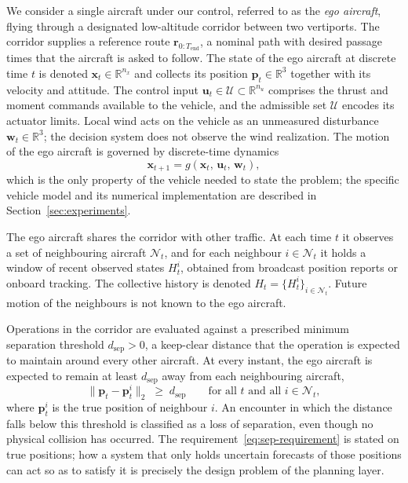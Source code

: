 \documentclass[11pt]{article}
\theoremstyle{plain}
\theoremstyle{definition}
\newcommand{\R}{\mathbb{R}}
\newcommand{\bx}{\bm{x}}
\newcommand{\bu}{\bm{u}}
\newcommand{\bw}{\bm{w}}
\begin{document}
We consider a single aircraft under our control, referred to as the
\emph{ego aircraft}, flying through a designated low-altitude corridor
between two vertiports. The corridor supplies a reference route
$\bm{r}_{0:T_{\mathrm{end}}}$, a nominal path with desired passage times
that the aircraft is asked to follow. The state of the ego aircraft at
discrete time $t$ is denoted $\bx_t \in \R^{n_x}$ and collects its
position $\bm{p}_t \in \R^3$ together with its velocity and attitude. The
control input $\bu_t \in \mathcal{U} \subset \R^{n_u}$ comprises the
thrust and moment commands available to the vehicle, and the admissible
set $\mathcal{U}$ encodes its actuator limits. Local wind acts on the
vehicle as an unmeasured disturbance $\bw_t \in \R^3$; the decision
system does not observe the wind realization. The motion of the ego aircraft is governed by
discrete-time dynamics
\begin{equation}
	\label{eq:dynamics}
	\bx_{t+1} = g(\bx_t,\, \bu_t,\, \bw_t),
\end{equation}
which is the only property of the vehicle needed to state the problem;
the specific vehicle model and its numerical implementation are described
in Section~\ref{sec:experiments}.
 
The ego aircraft shares the corridor with other traffic. At each time $t$
it observes a set of neighbouring aircraft $\mathcal{N}_t$, and for each
neighbour $i \in \mathcal{N}_t$ it holds a window of recent observed
states $H^i_t$, obtained from broadcast position reports or onboard
tracking. The collective history is denoted
$H_t = \{H^i_t\}_{i \in \mathcal{N}_t}$. Future motion of the neighbours
is not known to the ego aircraft.
 
Operations in the corridor are evaluated against a prescribed minimum
separation threshold $d_{\mathrm{sep}} > 0$, a keep-clear distance that
the operation is expected to maintain around every other aircraft. At
every instant, the ego aircraft is expected to remain at least
$d_{\mathrm{sep}}$ away from each neighbouring aircraft,
\begin{equation}
	\label{eq:sep-requirement}
	\big\| \bm{p}_t - \bm{p}^i_t \big\|_2 \;\geq\; d_{\mathrm{sep}}
	\qquad \text{for all } t \text{ and all } i \in \mathcal{N}_t,
\end{equation}
where $\bm{p}^i_t$ is the true position of neighbour $i$. An encounter
in which the distance falls below this threshold is classified as a loss
of separation, even though no physical collision has occurred. The
requirement~\eqref{eq:sep-requirement} is stated on true positions; how a
system that only holds uncertain forecasts of those positions can act so
as to satisfy it is precisely the design problem of the planning layer.
 
\end{document}
